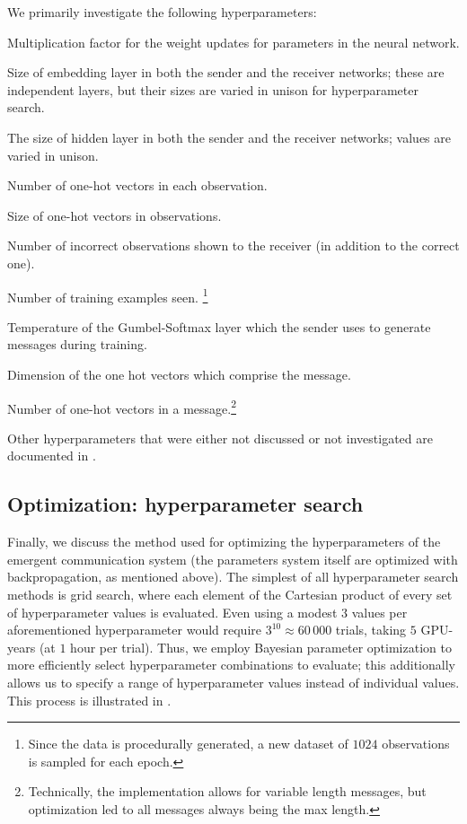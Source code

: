 We primarily investigate the following hyperparameters:
\begin{description}[nosep]
  \item[Learning rate] Multiplication factor for the weight updates for parameters in the neural network.
  \item[Embedding size] Size of embedding layer in both the sender and the receiver networks; these are independent layers, but their sizes are varied in unison for hyperparameter search.
  \item[Hidden size] The size of hidden layer in both the sender and the receiver networks; values are varied in unison.
  \item[\textit{n} attributes] Number of one-hot vectors in each observation.
  \item[\textit{n} values] Size of one-hot vectors in observations.
  \item[\textit{n} distractors] Number of incorrect observations shown to the receiver (in addition to the correct one).
  \item[\textit{n} epochs] Number of training examples seen.
    \unskip\footnote{Since the data is procedurally generated, a new dataset of $1024$ observations is sampled for each epoch.}
  \item[Temperature] Temperature of the Gumbel-Softmax layer which the sender uses to generate messages during training.
  \item[Vocabulary size] Dimension of the one hot vectors which comprise the message.
  \item[Message length] Number of one-hot vectors in a message.\footnote{Technically, the implementation allows for variable length messages, but optimization led to all messages always being the max length.}
\end{description}
Other hyperparameters that were either not discussed or not investigated are documented in .


\subsection{Optimization: hyperparameter search}
Finally, we discuss the method used for optimizing the hyperparameters of the emergent communication system (the parameters system itself are optimized with backpropagation, as mentioned above).
The simplest of all hyperparameter search methods is grid search, where each element of the Cartesian product of every set of hyperparameter values is evaluated.
Even using a modest $3$ values per aforementioned hyperparameter would require $3^{10}\approx60\,000$ trials, taking $5$ GPU-years (at $1$ hour per trial).
Thus, we employ Bayesian parameter optimization to more efficiently select hyperparameter combinations to evaluate; this additionally allows us to specify a range of hyperparameter values instead of individual values.
This process is illustrated in .

